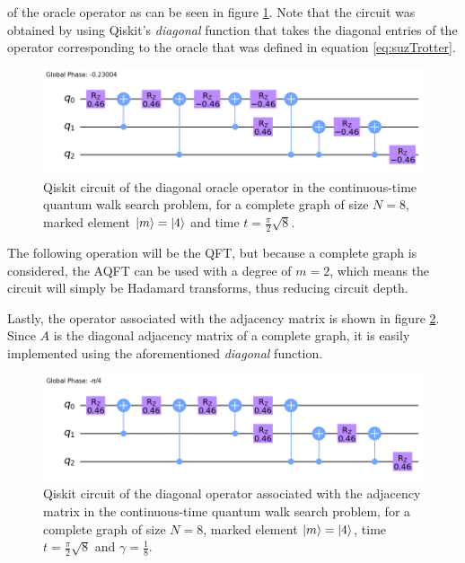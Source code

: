 \documentclass[../../dissertation.tex]{subfiles}
\begin{document}
of the oracle operator as can be seen in figure
\ref{fig:contSearchOracleCircQistkit}. Note that the circuit was obtained by
using Qiskit's \textit{diagonal} function that takes the diagonal entries of
the operator corresponding to the oracle that was defined in equation
\ref{eq:suzTrotter}. 
\begin{figure}[!h]
	\centering
	\includegraphics[scale=0.30]{img/Qiskit/ContQuantumWalk/Search/Circuits/circOracle_N3_S2.png}
	\caption{Qiskit circuit of the  diagonal oracle operator in the continuous-time quantum walk search problem, for a complete graph of size $N=8$, marked element $\ket{m}=\ket{4}$ and time $t=\frac{\pi}{2} \sqrt{8}$.}
	\label{fig:contSearchOracleCircQistkit}
\end{figure}\par

The following operation will be the QFT, but because a
complete graph is considered, the AQFT can be used with a degree of $m=2$,
which means the circuit will simply be Hadamard transforms, thus reducing
circuit depth.\par

Lastly, the operator associated with the adjacency matrix is shown in figure
\ref{fig:contSearchAdjCircQistkit}. Since $A$ is the diagonal adjacency matrix
of a complete graph, it is easily implemented using the aforementioned
\textit{diagonal} function.
\begin{figure}[!h]
	\centering
	\includegraphics[scale=0.30]{img/Qiskit/ContQuantumWalk/Search/Circuits/circAjd_N3_S2.png}
	\caption{Qiskit circuit of the  diagonal operator associated with the adjacency matrix in the continuous-time quantum walk search problem, for a complete graph of size $N=8$, marked element $\ket{m}=\ket{4}$, time $t=\frac{\pi}{2} \sqrt{8}$ and $\gamma = \frac{1}{8}$.}
	\label{fig:contSearchAdjCircQistkit}
\end{figure}\par
\end{document}
